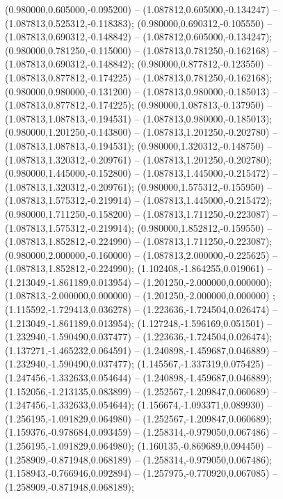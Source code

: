  (0.980000,0.605000,-0.095200) -- (1.087812,0.605000,-0.134247) -- (1.087813,0.525312,-0.118383);
 (0.980000,0.690312,-0.105550) -- (1.087813,0.690312,-0.148842) -- (1.087812,0.605000,-0.134247);
 (0.980000,0.781250,-0.115000) -- (1.087813,0.781250,-0.162168) -- (1.087813,0.690312,-0.148842);
 (0.980000,0.877812,-0.123550) -- (1.087813,0.877812,-0.174225) -- (1.087813,0.781250,-0.162168);
 (0.980000,0.980000,-0.131200) -- (1.087813,0.980000,-0.185013) -- (1.087813,0.877812,-0.174225);
 (0.980000,1.087813,-0.137950) -- (1.087813,1.087813,-0.194531) -- (1.087813,0.980000,-0.185013);
 (0.980000,1.201250,-0.143800) -- (1.087813,1.201250,-0.202780) -- (1.087813,1.087813,-0.194531);
 (0.980000,1.320312,-0.148750) -- (1.087813,1.320312,-0.209761) -- (1.087813,1.201250,-0.202780);
 (0.980000,1.445000,-0.152800) -- (1.087813,1.445000,-0.215472) -- (1.087813,1.320312,-0.209761);
 (0.980000,1.575312,-0.155950) -- (1.087813,1.575312,-0.219914) -- (1.087813,1.445000,-0.215472);
 (0.980000,1.711250,-0.158200) -- (1.087813,1.711250,-0.223087) -- (1.087813,1.575312,-0.219914);
 (0.980000,1.852812,-0.159550) -- (1.087813,1.852812,-0.224990) -- (1.087813,1.711250,-0.223087);
 (0.980000,2.000000,-0.160000) -- (1.087813,2.000000,-0.225625) -- (1.087813,1.852812,-0.224990);
 (1.102408,-1.864255,0.019061) -- (1.213049,-1.861189,0.013954) -- (1.201250,-2.000000,0.000000);
 (1.087813,-2.000000,0.000000) -- (1.201250,-2.000000,0.000000) ;
 (1.115592,-1.729413,0.036278) -- (1.223636,-1.724504,0.026474) -- (1.213049,-1.861189,0.013954);
 (1.127248,-1.596169,0.051501) -- (1.232940,-1.590490,0.037477) -- (1.223636,-1.724504,0.026474);
 (1.137271,-1.465232,0.064591) -- (1.240898,-1.459687,0.046889) -- (1.232940,-1.590490,0.037477);
 (1.145567,-1.337319,0.075425) -- (1.247456,-1.332633,0.054644) -- (1.240898,-1.459687,0.046889);
 (1.152056,-1.213135,0.083899) -- (1.252567,-1.209847,0.060689) -- (1.247456,-1.332633,0.054644);
 (1.156674,-1.093371,0.089930) -- (1.256195,-1.091829,0.064980) -- (1.252567,-1.209847,0.060689);
 (1.159376,-0.978684,0.093459) -- (1.258314,-0.979050,0.067486) -- (1.256195,-1.091829,0.064980);
 (1.160135,-0.869689,0.094450) -- (1.258909,-0.871948,0.068189) -- (1.258314,-0.979050,0.067486);
 (1.158943,-0.766946,0.092894) -- (1.257975,-0.770920,0.067085) -- (1.258909,-0.871948,0.068189);
